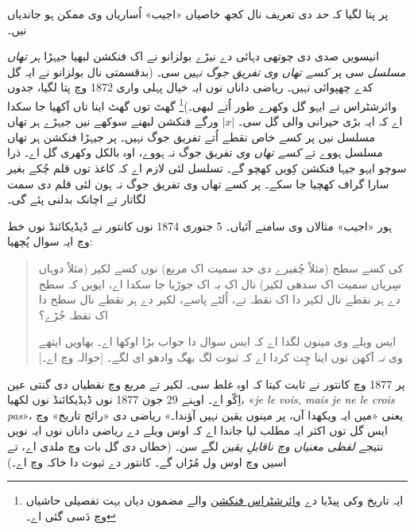 \documentclass[../../../include/open-logic-section]{subfiles}
\begin{document}

پر پتا لگیا کہ \emph{حد} دی تعریف نال کجھ خاصیاں «اجیب» اُساریاں وی ممکن ہو جاندیاں نیں۔

انیسویں صدی دی چوتھی دہائی دے نیڑے بولزانو نے اک فنکشن لبھیا جیہڑا \emph{ہر تھاں مسلسل} سی پر \emph{کسے تھاں وی تفریق جوگ نہیں} سی۔ (بدقسمتی نال بولزانو نے ایہ گل کدے چھپوائی نہیں۔ ریاضی داناں نوں ایہ خیال پہلی واری 1872 وچ پتا لگیا، جدوں وائرشٹراس نے ایہو گل وکھرے طور اُتے لبھی۔)\footnote{ایہ تاریخ وکی پیڈیا دے \href{http://en.wikipedia.org/wiki/Weierstrass_function}{وائرشٹراس فنکشن} والے مضمون دیاں بہت تفصیلی حاشیاں وچ دَسی گئی اے۔} گھٹ توں گھٹ اینا تاں آکھیا جا سکدا اے کہ ایہ بڑی حیرانی والی گل سی۔ $|x|$ ورگے فنکشن لبھنے سوکھے نیں جیہڑے ہر تھاں مسلسل نیں پر کسے خاص نقطے اُتے تفریق جوگ نہیں۔ پر جیہڑا فنکشن ہر تھاں مسلسل ہووے تے \emph{کسے تھاں وی} تفریق جوگ نہ ہووے، اوہ بالکل وکھری گل اے۔ ذرا سوچو ایہو جیہا فنکشن کِویں کھچو گے۔ تسلسل لئی لازم اے کہ کاغذ توں قلم چُکے بغیر سارا گراف کھچیا جا سکے۔ پر کسے تھاں وی تفریق جوگ نہ ہون لئی قلم دی سمت لگاتار تے اچانک بدلنی پئے گی۔

ہور «اجیب» مثالاں وی سامنے آئیاں۔ 5 جنوری 1874 نوں کانتور نے ڈیڈیکائنڈ نوں خط وچ ایہ سوال پُچھیا:
\begin{quote}
کی کسے سطح (مثلاً چُفیرے دی حد سمیت اک مربع) نوں کسے لکیر (مثلاً دوہاں سِریاں سمیت اک سدھی لکیر) نال اک بہ اک جوڑیا جا سکدا اے، ایویں کہ سطح دے ہر نقطے نال لکیر دا اک نقطہ تے، اُلٹے پاسے، لکیر دے ہر نقطے نال سطح دا اک نقطہ جُڑے؟

ایس ویلے وی مینوں لگدا اے کہ ایس سوال دا جواب بڑا اوکھا اے۔ بھاویں ایتھے وی \emph{نہ} آکھن نوں اینا چِت کردا اے کہ ثبوت لگ بھگ وادھو ای لگے۔ [حوالہ \citealt{Gouvea2011} وچ اے۔]
\end{quote}
پر 1877 وچ کانتور نے ثابت کیتا کہ اوہ غلط سی۔ لکیر تے مربع وچ نقطیاں دی گنتی عین اِکّو اے۔ اوہنے 29 جون 1877 نوں ڈیڈیکائنڈ نوں لکھیا، «\emph{je le vois, mais je ne le crois pas}»، یعنی «میں ایہ ویکھدا آں، پر مینوں یقین نہیں آؤندا۔» ریاضی دی «رائج تاریخ» وچ ایس گل توں اکثر ایہ مطلب لیا جاندا اے کہ اوس ویلے دے ریاضی داناں نوں ایہ نویں نتیجے \emph{لفظی معنیاں وچ ناقابلِ یقین} لگے سن۔ (خطاں دی گل بات \citet{Gouvea2011} وچ ملدی اے، تے اسیں  وچ اوس ول مُڑاں گے۔ کانتور دے ثبوت دا خاکہ  وچ اے۔)
\end{document}
